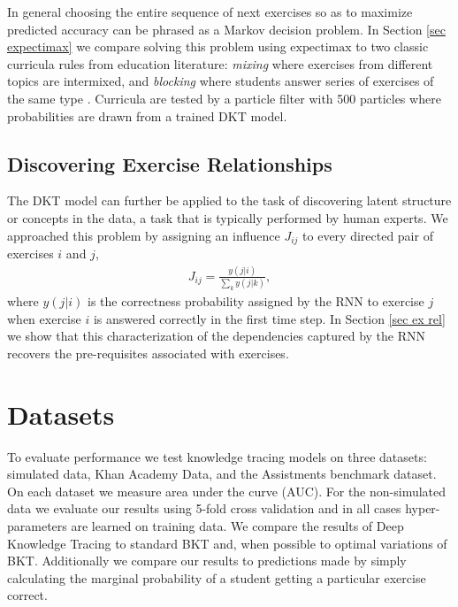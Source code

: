 \documentclass{article} \usepackage{nips,times}
\begin{document}
In general choosing the entire sequence of next exercises so as to maximize predicted accuracy can be phrased as a Markov decision problem.
In Section \ref{sec expectimax}
we compare solving this problem using $\mathrm{expectimax}$ to two classic curricula rules from education literature: {\em mixing} where exercises from different topics are intermixed, and {\em blocking} where students answer series of exercises of the same type \cite{rohrer2009effects}. Curricula are tested by a particle filter with 500 particles where probabilities are drawn from a trained DKT model. 

 






















\subsection{Discovering Exercise Relationships}

The DKT model can further be applied to the task of discovering latent structure or concepts in the data, a task that is typically performed by human experts.
We approached this problem by assigning an influence $J_{ij}$ to every directed pair of exercises $i$ and $j$,
\begin{align}
\label{eq influence}
J_{ij} = \frac{y\left(j|i\right)}{\sum_k y\left(j|k\right)},
\end{align}
where $y\left(j|i\right)$ is the correctness probability assigned by the RNN to exercise $j$ when exercise $i$ is answered correctly in the first time step.
In Section \ref{sec ex rel} we show that this characterization of the dependencies captured by the RNN recovers the pre-requisites associated with exercises.







\section{Datasets}

To evaluate performance we test knowledge tracing models on three datasets: simulated data, Khan Academy Data, and the Assistments benchmark dataset. On each dataset we measure area under the curve (AUC). For the non-simulated data we evaluate our results using 5-fold cross validation and in all cases hyper-parameters are learned on training data. We compare the results of Deep Knowledge Tracing to standard BKT and, when possible to optimal variations of BKT. Additionally we compare our results to predictions made by simply calculating the marginal probability of a student getting a particular exercise correct.
\end{document}

